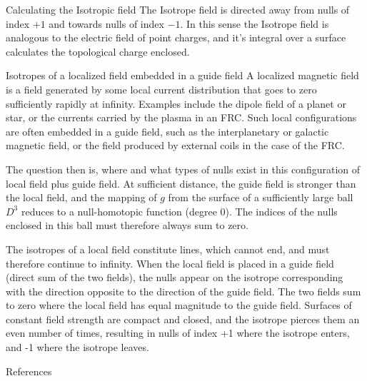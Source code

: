 \documentclass[final]{beamer}
\newlength{\onecolwid}
\begin{document}
\begin{frame}[t]
\begin{columns}[t]
\begin{column}{\onecolwid}
\begin{block}{Calculating the Isotropic field}
    The Isotrope field is directed away from nulls of index $+1$ and towards nulls of
    index $-1$.
    In this sense the Isotrope field is analogous to the electric field of  point charges, and it's
    integral over a surface calculates the topological charge enclosed.



\end{block}

\begin{block}{Isotropes of a localized field embedded in a guide field}
    A localized magnetic field is a field generated by some local current distribution
    that goes to zero sufficiently rapidly at infinity. 
    Examples include the dipole field of a planet or star, or the currents carried by the
    plasma in an FRC. 
    Such local configurations are often embedded in a guide field, such as the
    interplanetary or galactic magnetic field, or the field produced by external coils in
    the case of the FRC. 

    The question then is, where and what types of nulls exist in this configuration of
    local field plus guide field. 
    At sufficient distance, the guide field is stronger than the local field, and the
    mapping of $g$ from the surface of a sufficiently large ball $D^3$ reduces to a null-homotopic
    function (degree 0).
    The indices of the nulls enclosed in this ball must therefore always sum to zero. 

    The isotropes of a local field
    constitute lines, which cannot end, and must therefore continue to infinity. 
    When the local field is placed in a guide field (direct sum of the two fields), the
    nulls appear on the isotrope corresponding with the direction opposite to the
    direction of the guide field. 
    The two fields sum to zero where the local field has equal magnitude to the guide
    field. 
    Surfaces of constant field strength are compact and closed, and the isotrope pierces
    them an even number of times, resulting in nulls of index +1 where the isotrope
    enters, and -1 where the isotrope leaves. 
    




\end{block}


\begin{block}{References}


\end{block}
\end{column}
\end{columns}
\end{frame}
\end{document}
